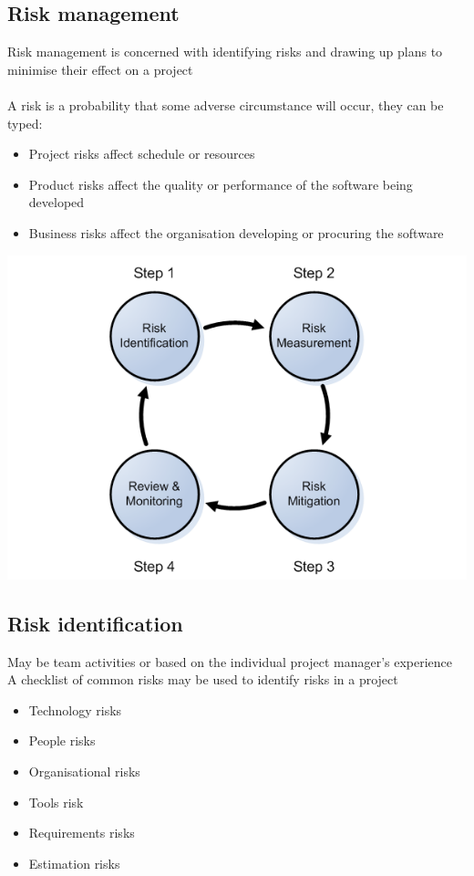\documentclass{article}[18pt]
\begin{document}
\subsection{Risk management}
Risk management is concerned with identifying risks and drawing up plans to minimise their effect on a project\\
\\
A risk is a probability that some adverse circumstance will occur, they can be typed:
\begin{itemize}
	\item Project risks affect schedule or resources
	\item Product risks affect the quality or performance of the software being developed
	\item Business risks affect the organisation developing or procuring the software
\end{itemize}
\begin{center}
	\includegraphics[scale=0.5]{"risk management"}
\end{center}
\subsection{Risk identification}
May be team activities or based on the individual project manager's experience\\
A checklist of common risks may be used to identify risks in a project
\begin{itemize}
	\item Technology risks
	\item People risks
	\item Organisational risks
	\item Tools risk
	\item Requirements risks
	\item Estimation risks
\end{itemize}
\end{document}
